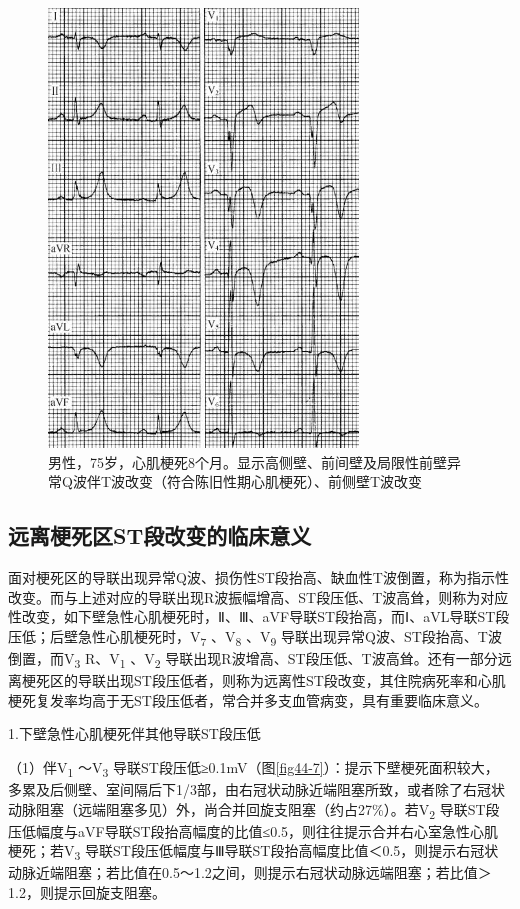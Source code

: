\begin{figure}[!htbp]
 \centering
 \includegraphics[width=3.23958in,height=4.58333in]{./images/Image00719.jpg}
 \captionsetup{justification=centering}
 \caption{男性，75岁，心肌梗死8个月。显示高侧壁、前间壁及局限性前壁异常Q波伴T波改变（符合陈旧性期心肌梗死）、前侧壁T波改变}
 \label{fig44-11}
  \end{figure} 

\protect\hypertarget{text00052.htmlux5cux23subid627}{}{}

\subsection{远离梗死区ST段改变的临床意义}

面对梗死区的导联出现异常Q波、损伤性ST段抬高、缺血性T波倒置，称为指示性改变。而与上述对应的导联出现R波振幅增高、ST段压低、T波高耸，则称为对应性改变，如下壁急性心肌梗死时，Ⅱ、Ⅲ、aVF导联ST段抬高，而Ⅰ、aVL导联ST段压低；后壁急性心肌梗死时，V\textsubscript{7}
、V\textsubscript{8} 、V\textsubscript{9}
导联出现异常Q波、ST段抬高、T波倒置，而V\textsubscript{3}
R、V\textsubscript{1} 、V\textsubscript{2}
导联出现R波增高、ST段压低、T波高耸。还有一部分远离梗死区的导联出现ST段压低者，则称为远离性ST段改变，其住院病死率和心肌梗死复发率均高于无ST段压低者，常合并多支血管病变，具有重要临床意义。

1.下壁急性心肌梗死伴其他导联ST段压低

（1）伴V\textsubscript{1} ～V\textsubscript{3}
导联ST段压低≥0.1mV（图\ref{fig44-7}）：提示下壁梗死面积较大，多累及后侧壁、室间隔后下1/3部，由右冠状动脉近端阻塞所致，或者除了右冠状动脉阻塞（远端阻塞多见）外，尚合并回旋支阻塞（约占27\%）。若V\textsubscript{2}
导联ST段压低幅度与aVF导联ST段抬高幅度的比值≤0.5，则往往提示合并右心室急性心肌梗死；若V\textsubscript{3}
导联ST段压低幅度与Ⅲ导联ST段抬高幅度比值＜0.5，则提示右冠状动脉近端阻塞；若比值在0.5～1.2之间，则提示右冠状动脉远端阻塞；若比值＞1.2，则提示回旋支阻塞。

